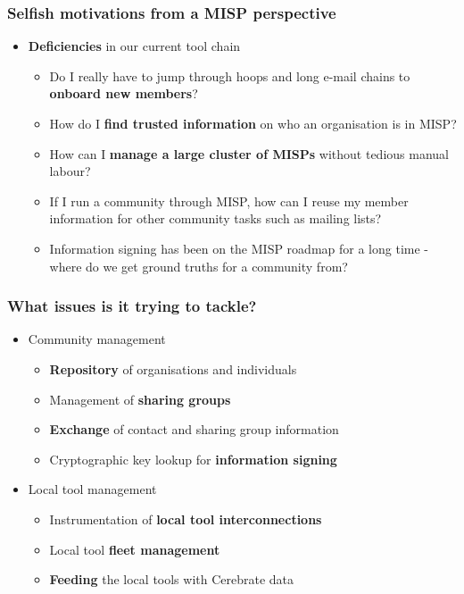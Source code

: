 \begin{frame}
	\frametitle{Selfish motivations from a MISP perspective}
	\begin{itemize}
            \item {\bf Deficiencies} in our current tool chain
            \begin{itemize}
                \item Do I really have to jump through hoops and long e-mail chains to {\bf onboard new members}?
                \item How do I {\bf find trusted information} on who an organisation is in MISP?
                \item How can I {\bf manage a large cluster of MISPs} without tedious manual labour?
                \item If I run a community through MISP, how can I reuse my member information for other community tasks such as mailing lists?
                \item Information signing has been on the MISP roadmap for a long time - where do we get ground truths for a community from?
            \end{itemize}
        \end{itemize}
\end{frame}

\begin{frame}
	\frametitle{What issues is it trying to tackle?}
	\begin{itemize}
                \item Community management
		\begin{itemize}
                    \item {\bf Repository} of organisations and individuals
                    \item Management of {\bf sharing groups}
                    \item {\bf Exchange} of contact and sharing group information
                    \item Cryptographic key lookup for {\bf information signing}
		\end{itemize}
                \item Local tool management
		\begin{itemize}
                    \item Instrumentation of {\bf local tool interconnections}
                    \item Local tool {\bf fleet management}
                    \item {\bf Feeding} the local tools with Cerebrate data
                \end{itemize}
	\end{itemize}
\end{frame}

